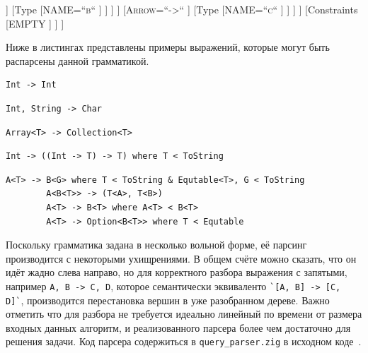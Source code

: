 \documentclass[times]{itmo-student-thesis}
\begin{document}
	\begin{forest}
		[Query
		[NP
		[Type
		[Type
		[\textsc{TypeList<“,“>}
		[Type
		[\textsc{NAME=“a“}
		]
		]
		[Type
		[\textsc{NAME=“b“}
		]
		]
		]
		]
		[\textsc{Arrow=“->“}
		]
		[Type
		[\textsc{NAME=“c“}
		]
		]
		]
		]
		[Constraints
		[EMPTY
		]
		]
		]
	\end{forest}
	
	Ниже в листингах представлены примеры выражений, которые могут быть распарсены данной грамматикой.
	
	
	\begin{lstlisting}[caption={Стрелка из a в b},label={query_example1}]
		Int -> Int
	\end{lstlisting}
	
	\begin{lstlisting}[caption={Стрелка из двух неупорядоченных типов, что соответсвует функциональному типу с точки зрения ООП языков вроде Java},label={query_example2}]
		Int, String -> Char
	\end{lstlisting}
	
	\begin{lstlisting}[caption={Стрелка между двумя номинативными типами, которые параметризованы дженериками},label={query_example3}]
		Array<T> -> Collection<T>
	\end{lstlisting}
	
	\begin{lstlisting}[caption={Стрелка, возвращающая функциональный тип, принимающий на вход \lstinline{Int -> T} и возвращающая \lstinline{T}, который имеет ограничение},label={query_example4}]
		Int -> ((Int -> T) -> T) where T < ToString
	\end{lstlisting}
	
	\begin{lstlisting}[caption={Другие более сложные примеры},label={query_example5}]
		A<T> -> B<G> where T < ToString & Equtable<T>, G < ToString
		A<B<T>> -> (T<A>, T<B>)
		A<T> -> B<T> where A<T> < B<T>
		A<T> -> Option<B<T>> where T < Equtable
	\end{lstlisting}
	
	Поскольку грамматика задана в несколько вольной форме, её парсинг производится с некоторыми ухищрениями. В общем счёте можно сказать, что он идёт жадно слева направо, но для корректного разбора выражения с запятыми, например \lstinline{A, B -> C, D}, которое семантически эквиваленто  \lstinline{`[A, B] -> [C, D]`}, производится перестановка вершин в уже разобранном дереве. Важно отметить что для разбора не требуется идеально линейный по времени от размера входных данных алгоритм, и реализованного парсера более чем достаточно для решения задачи. Код парсера содержиться в \lstinline{query_parser.zig} в исходном коде~\cite{sourcecode}.
	
\end{document}
